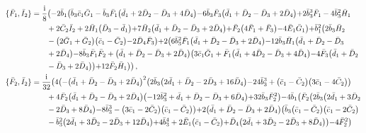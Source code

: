 \documentclass[10pt]{amsart}
\theoremstyle{definition}
\theoremstyle{corollary}
\theoremstyle{remark}
\theoremstyle{conclusion}
\begin{document}
\begin{align} 
\{\bar{F}_1, \bar{I}_2\}&=\frac{{\rm i}}{8}  \bigl(-2 \bar{b}_1 \bigl(\bar{b}_3 \bar{c}_1 \bar{G}_1-\bar{b}_3 \bar{F}_1 \bigl(\bar{d}_1+2 \bar{D}_2-\bar{D}_3+4 \bar{D}_4\bigl)-6 \bar{b}_3 \bar{F}_3 \bigl(\bar{d}_1+\bar{D}_2-\bar{D}_3+2 \bar{D}_4\bigl)+2 \bar{b}_3^3 \bar{F}_1-4 \bar{b}_3^2 \bar{H}_1 \nonumber \\
& \hskip 0.7cm+2 \bar{C}_2 \bar{I}_2+2 \bar{H}_1 \bigl(\bar{D}_3-\bar{d}_1\bigl)+7 \bar{H}_2 \bigl(\bar{d}_1+\bar{D}_2-\bar{D}_3+2 \bar{D}_4\bigl)+\bar{F}_2 \bigl(4 \bar{F}_1+\bar{F}_3\bigl)-4 \bar{E}_1 \bar{G}_1\bigl)+\bar{b}_1^2 \bigl(2 \bar{b}_3 \bar{H}_2 \nonumber \\
& \hskip 0.7cm-\bigl(2 \bar{G}_1+\bar{G}_2\bigl) \bigl(\bar{c}_1-\bar{C}_2\bigl)-2 \bar{D}_4 \bar{F}_3\bigl)+2 \bigl(6 \bar{b}_3^2 \bar{F}_1 \bigl(\bar{d}_1+\bar{D}_2-\bar{D}_3+2 \bar{D}_4\bigl)-12 \bar{b}_3 \bar{H}_1 \bigl(\bar{d}_1+\bar{D}_2-\bar{D}_3 \nonumber \\
& \hskip 0.7cm+2 \bar{D}_4\bigl)-8 \bar{b}_3 \bar{F}_1 \bar{F}_2+\bigl(\bar{d}_1+\bar{D}_2-\bar{D}_3+2 \bar{D}_4\bigl) \bigl(3 \bar{c}_1 \bar{G}_1+\bar{F}_1 \bigl(\bar{d}_1+4 \bar{D}_2-\bar{D}_3+4 \bar{D}_4\bigl)-4 \bar{F}_3 \bigl(\bar{d}_1+\bar{D}_2 \nonumber \\
& \hskip 0.7cm-\bar{D}_3+2 \bar{D}_4\bigl)\bigl)+12 \bar{F}_2 \bar{H}_1\bigl)\bigl) \, , \nonumber \\
\{\bar{F}_2, \bar{I}_2\}&=\frac{{\rm i}}{32}\bigl(4 \bigl(-\bigl(\bar{d}_1+\bar{D}_2-\bar{D}_3+2 \bar{D}_4\bigl)^2 \bigl(2 \bar{b}_3 \bigl(2 \bar{d}_1+\bar{D}_2-2 \bar{D}_3+16 \bar{D}_4\bigl)-24 \bar{b}_3^3+\bigl(\bar{c}_1-\bar{C}_2\bigl) \bigl(3 \bar{c}_1-4 \bar{C}_2\bigl)\bigl) \nonumber \\
& \hskip 0.7cm+4 \bar{F}_2 \bigl(\bar{d}_1+\bar{D}_2-\bar{D}_3+2 \bar{D}_4\bigl) \bigl(-12 \bar{b}_3^2+\bar{d}_1+\bar{D}_2-\bar{D}_3+6 \bar{D}_4\bigl)+32 \bar{b}_3 \bar{F}_2^2\bigl)-4 \bar{b}_1 \bigl(\bar{F}_2 \bigl(2 \bar{b}_3 \bigl(2 \bar{d}_1+3 \bar{D}_2 \nonumber \\
& \hskip 0.7cm-2 \bar{D}_3+8 \bar{D}_4\bigl)-8 \bar{b}_3^3-\bigl(3 \bar{c}_1-2 \bar{C}_2\bigl) \bigl(\bar{c}_1-\bar{C}_2\bigl)\bigl)+2 \bigl(\bar{d}_1+\bar{D}_2-\bar{D}_3+2 \bar{D}_4\bigl) \bigl(\bar{b}_3 \bigl(\bar{c}_1-\bar{C}_2\bigl) \bigl(\bar{c}_1-2 \bar{C}_2\bigl) \nonumber \\
& \hskip 0.7cm-\bar{b}_3^2 \bigl(2 \bar{d}_1+3 \bar{D}_2-2 \bar{D}_3+12 \bar{D}_4\bigl)+4 \bar{b}_3^4+2 \bar{E}_1 \bigl(\bar{c}_1-\bar{C}_2\bigl)+\bar{D}_4 \bigl(2 \bar{d}_1+3 \bar{D}_2-2 \bar{D}_3+8 \bar{D}_4\bigl)\bigl)-4 \bar{F}_2^2\bigl) \nonumber \\

\end{align}
\end{document}
